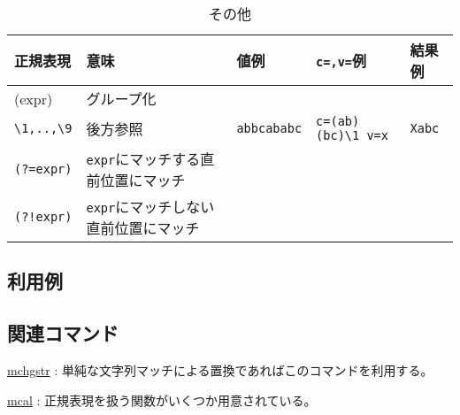 \begin{table}[htbp]
\begin{center}
{\small
\caption{その他\label{tbl:msed_regex4}}
\begin{tabular}{l|l|l|l|l}
\hline
正規表現        & 意味                                      & 値例             & \verb|c=,v=|例         & 結果例\\
\hline
(expr)          & グループ化                                &&& \\			
\verb|\1,..,\9| & 後方参照                                  & \verb|abbcababc| &\verb|c=(ab)(bc)\1 v=x| & \verb|Xabc| \\
\verb|(?=expr)| & \verb|expr|にマッチする直前位置にマッチ   &&& \\
\verb|(?!expr)| & \verb|expr|にマッチしない直前位置にマッチ &&& \\
\hline
\end{tabular} 
}
\end{center}
\end{table} 


\subsection*{利用例}

\subsection*{関連コマンド}
\hyperref[sect:mchgstr] {mchgstr} : 単純な文字列マッチによる置換であればこのコマンドを利用する。

\hyperref[sect:mcal] {mcal} : 正規表現を扱う関数がいくつか用意されている。

%
